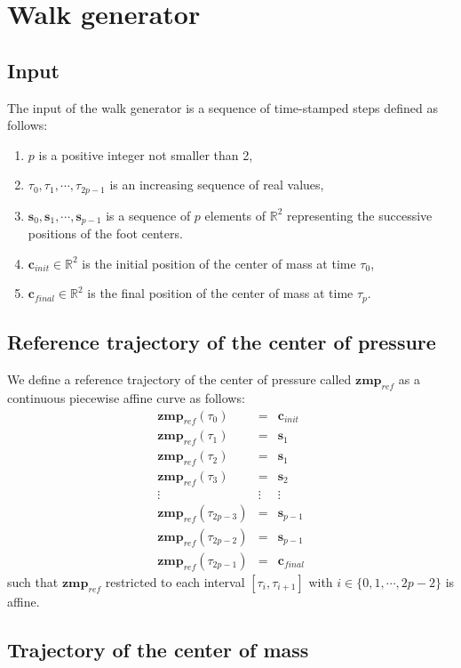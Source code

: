 \documentclass {article}
\newcommand\real{\mathbb{R}}
\newcommand\step{\mathbf{s}}
\newcommand\com{\mathbf{c}}
\newcommand\zmpref{\mathbf{zmp}_{ref}}
\begin{document}
\section {Walk generator}

\subsection {Input}

The input of the walk generator is a sequence of time-stamped steps defined
as follows:
\begin{enumerate}
\item $p$ is a positive integer not smaller than 2,
\item $\tau_0, \tau_1, \cdots, \tau_{2p-1}$ is an increasing sequence of real values,
\item $\step_0, \step_1, \cdots, \step_{p-1}$ is a sequence of $p$ elements of
  $\real^2$ representing the successive positions of the foot centers.
\item $\com_{init}\in\real^2$ is the initial position of the center of mass at
  time $\tau_0$,
\item $\com_{final}\in\real^2$ is the final position of the center of mass at time
  $\tau_p$.
\end{enumerate}

\subsection {Reference trajectory of the center of pressure}

We define a reference trajectory of the center of pressure called
$\zmpref$ as a continuous piecewise affine curve as follows:
\begin{eqnarray*}
\zmpref (\tau_0) &=& \com_{init} \\
\zmpref (\tau_1) &=& \step_1 \\
\zmpref (\tau_2) &=& \step_1 \\
\zmpref (\tau_3) &=& \step_2 \\
\vdots & \vdots & \vdots \\
\zmpref (\tau_{2p-3}) &=& \step_{p-1} \\
\zmpref (\tau_{2p-2}) &=& \step_{p-1} \\
\zmpref (\tau_{2p-1}) &=& \com_{final}
\end{eqnarray*}
such that $\zmpref$ restricted to each interval $[\tau_i,\tau_{i+1}]$ with
$i\in\{0,1,\cdots,2p-2\}$ is affine.

\subsection {Trajectory of the center of mass}
\end{document}
